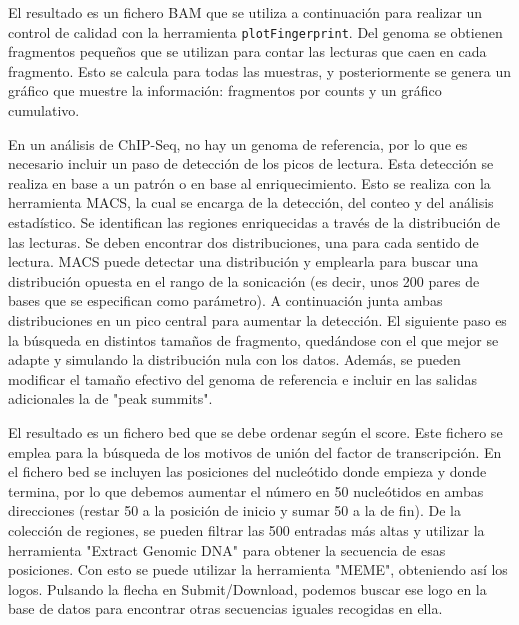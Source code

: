 El resultado es un fichero BAM que se utiliza a continuación para realizar un control de calidad con la herramienta \texttt{plotFingerprint}. Del genoma se obtienen fragmentos pequeños que se utilizan para contar las lecturas que caen en cada fragmento. Esto se calcula para todas las muestras, y posteriormente se genera un gráfico que muestre la información: fragmentos por counts y un gráfico cumulativo.

En un análisis de ChIP-Seq, no hay un genoma de referencia, por lo que es necesario incluir un paso de detección de los picos de lectura. Esta detección se realiza en base a un patrón o en base al enriquecimiento. Esto se realiza con la herramienta MACS, la cual se encarga de la detección, del conteo y del análisis estadístico. Se identifican las regiones enriquecidas a través de la distribución de las lecturas. Se deben encontrar dos distribuciones, una para cada sentido de lectura. MACS puede detectar una distribución y emplearla para buscar una distribución opuesta en el rango de la sonicación (es decir, unos 200 pares de bases que se especifican como parámetro). A continuación junta ambas distribuciones en un pico central para aumentar la detección. 
El siguiente paso es la búsqueda en distintos tamaños de fragmento, quedándose con el que mejor se adapte y simulando la distribución nula con los datos. Además, se pueden modificar el tamaño efectivo del genoma de referencia e incluir en las salidas adicionales la de "peak summits". 

El resultado es un fichero bed que se debe ordenar según el score. Este fichero se emplea para la búsqueda de los motivos de unión del factor de transcripción. En el fichero bed se incluyen las posiciones del nucleótido donde empieza y donde termina, por lo que debemos aumentar el número en 50 nucleótidos en ambas direcciones (restar 50 a la posición de inicio y sumar 50 a la de fin). De la colección de regiones, se pueden filtrar las 500 entradas más altas y utilizar la herramienta "Extract Genomic DNA" para obtener la secuencia de esas posiciones. Con esto se puede utilizar la herramienta "MEME", obteniendo así los logos. Pulsando la flecha en Submit/Download, podemos buscar ese logo en la base de datos para encontrar otras secuencias iguales recogidas en ella.